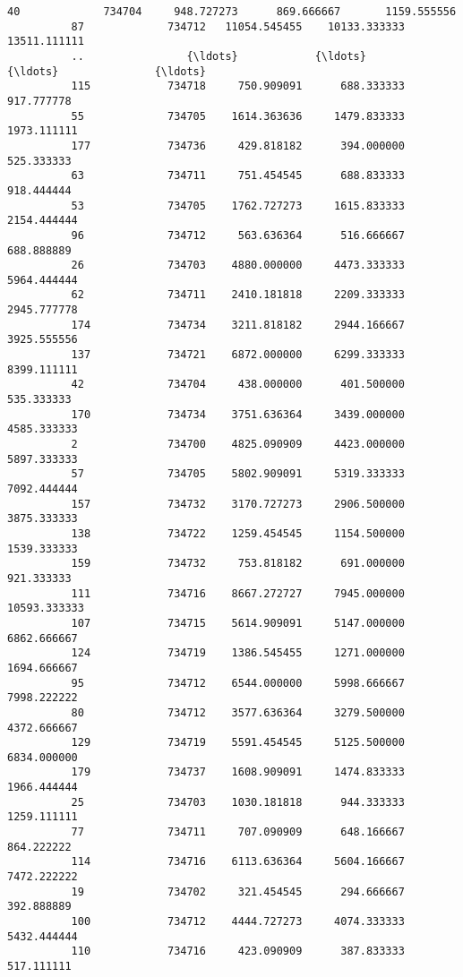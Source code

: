 \documentclass[11pt]{article}
\begin{document}
\begin{Verbatim}[commandchars=\\\{\}]
          40             734704     948.727273      869.666667       1159.555556   
          87             734712   11054.545455    10133.333333      13511.111111   
          ..                {\ldots}            {\ldots}             {\ldots}               {\ldots}   
          115            734718     750.909091      688.333333        917.777778   
          55             734705    1614.363636     1479.833333       1973.111111   
          177            734736     429.818182      394.000000        525.333333   
          63             734711     751.454545      688.833333        918.444444   
          53             734705    1762.727273     1615.833333       2154.444444   
          96             734712     563.636364      516.666667        688.888889   
          26             734703    4880.000000     4473.333333       5964.444444   
          62             734711    2410.181818     2209.333333       2945.777778   
          174            734734    3211.818182     2944.166667       3925.555556   
          137            734721    6872.000000     6299.333333       8399.111111   
          42             734704     438.000000      401.500000        535.333333   
          170            734734    3751.636364     3439.000000       4585.333333   
          2              734700    4825.090909     4423.000000       5897.333333   
          57             734705    5802.909091     5319.333333       7092.444444   
          157            734732    3170.727273     2906.500000       3875.333333   
          138            734722    1259.454545     1154.500000       1539.333333   
          159            734732     753.818182      691.000000        921.333333   
          111            734716    8667.272727     7945.000000      10593.333333   
          107            734715    5614.909091     5147.000000       6862.666667   
          124            734719    1386.545455     1271.000000       1694.666667   
          95             734712    6544.000000     5998.666667       7998.222222   
          80             734712    3577.636364     3279.500000       4372.666667   
          129            734719    5591.454545     5125.500000       6834.000000   
          179            734737    1608.909091     1474.833333       1966.444444   
          25             734703    1030.181818      944.333333       1259.111111   
          77             734711     707.090909      648.166667        864.222222   
          114            734716    6113.636364     5604.166667       7472.222222   
          19             734702     321.454545      294.666667        392.888889   
          100            734712    4444.727273     4074.333333       5432.444444   
          110            734716     423.090909      387.833333        517.111111   
          

\end{Verbatim}
\end{document}
